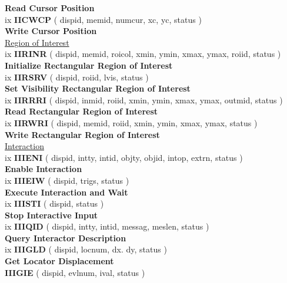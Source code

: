 \begin{tabbing}
                \> \> {\bf Read Cursor Position}\\ [1.5ex]
ix \> {\bf IICWCP} \> ( dispid, memid, numcur, xc, yc, status )\\
                \> \> {\bf Write Cursor Position}\\ [1.5ex]
\> \underline{Region of Interest}\\ [1.5ex]
ix \> {\bf IIRINR} \> ( dispid, memid, roicol, xmin, ymin, xmax, ymax, roiid,
                        status )\\
                \> \> {\bf Initialize Rectangular Region of Interest}\\ [1.5ex]
ix \> {\bf IIRSRV} \> ( dispid, roiid, lvis, status )\\
                \> \> {\bf Set Visibility Rectangular Region of Interest}\\
                      [1.5ex]
ix \> {\bf IIRRRI} \> ( dispid, inmid, roiid, xmin, ymin, xmax, ymax, outmid,
                        status )\\
                \> \> {\bf Read Rectangular Region of Interest}\\ [1.5ex]
ix \> {\bf IIRWRI} \> ( dispid, memid, roiid, xmin, ymin, xmax, ymax, status )\\
                \> \> {\bf Write Rectangular Region of Interest}\\
\> \underline{Interaction}\\ [1.5ex]
ix \> {\bf IIIENI} \> ( dispid, intty, intid, objty, objid, intop, extrn,
                        status )\\
                \> \> {\bf Enable Interaction}\\ [1.5ex]
ix \> {\bf IIIEIW} \> ( dispid, trigs, status )\\
                \> \> {\bf Execute Interaction and Wait}\\ [1.5ex]
ix \> {\bf IIISTI} \> ( dispid, status )\\
                \> \> {\bf Stop Interactive Input}\\ [1.5ex]
ix \> {\bf IIIQID} \> ( dispid, intty, intid, messag, meslen, status )\\
                \> \> {\bf Query Interactor Description}\\ [1.5ex]
ix \> {\bf IIIGLD} \> ( dispid, locnum, dx. dy, status )\\
                \> \> {\bf Get Locator Displacement}\\ [1.5ex]
   \> {\bf IIIGIE} \> ( dispid, evlnum, ival, status )\\

\end{tabbing}
